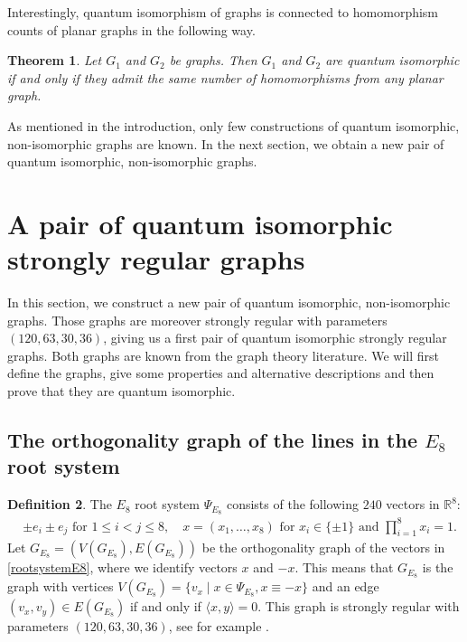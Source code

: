 \documentclass[11pt]{article}
\newtheorem{theo}{Theorem}[section]
\theoremstyle{definition}
\newtheorem{defi}[theo]{Definition}
\numberwithin{equation}{section}
\begin{document}
Interestingly, quantum isomorphism of graphs is connected to homomorphism counts of planar graphs in the following way. 

\begin{theo}\cite{MRplanar}
Let $G_1$ and $G_2$ be graphs. Then $G_1$ and $G_2$ are quantum isomorphic if and only if they admit the same number of homomorphisms from any planar graph. 
\end{theo}

As mentioned in the introduction, only few constructions of quantum isomorphic, non-isomorphic graphs are known. In the next section, we obtain a new pair of quantum isomorphic, non-isomorphic graphs.

\section{A pair of quantum isomorphic strongly regular graphs}\label{secpairqiso}

In this section, we construct a new pair of quantum isomorphic, non-isomorphic graphs. Those graphs are moreover strongly regular with parameters $(120, 63, 30, 36)$, giving us a first pair of quantum isomorphic strongly regular graphs. Both graphs are known from the graph theory literature. We will first define the graphs, give some properties and alternative descriptions and then prove that they are quantum isomorphic. 

\subsection[Orthogonality graph]{The orthogonality graph of the lines in the \texorpdfstring{$E_8$}{E8} root system}

\begin{defi}\label{defGE8}
The $E_8$ root system $\Psi_{E_8}$ consists of the following $240$ vectors in $\mathbb{R}^8$:
\begin{align}\label{rootsystemE8}
&\pm e_i \pm e_j \text{ for } 1 \leq i<j \leq 8, \quad  x=(x_1,\dots,x_8) \text{ for } x_i \in \{\pm 1\} \text{ and } \prod_{i=1}^8 x_i=1.
\end{align}
Let $G_{E_8}=(V(G_{E_8}), E(G_{E_8}))$ be the orthogonality graph of the vectors in \eqref{rootsystemE8}, where we identify vectors $x$ and $-x$. This means that $G_{E_8}$ is the graph with vertices $V(G_{E_8})=\{v_x \mid x \in \Psi_{E_8}, x \equiv-x\}$ and an edge $(v_x,v_y)\in E(G_{E_8})$ if and only if $\langle x, y\rangle=0$. This graph is strongly regular with parameters $(120, 63, 30, 36)$, see for example \cite[Section 10.39]{BVM}. \end{defi}
\end{document}
